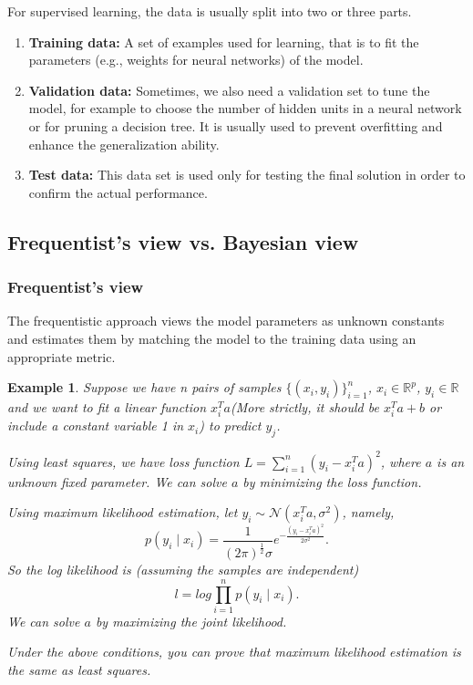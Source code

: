 \documentclass[11pt]{article}
\def\MN{{\mathcal N}}
\def\BR{{\mathbb R}}
\newtheorem{example}{Example}[section]
\begin{document}
For supervised learning, the data is usually split into two or three parts.
\begin{enumerate}[(1)]
\item \textbf{Training data:} A set of examples used for learning, that is to fit the parameters (e.g., weights for neural networks) of the model. 
\item \textbf{Validation data:}  Sometimes, we also need a validation set to tune the model, for example to choose the number of hidden units in a neural network or for pruning a decision tree. It is usually used to prevent overfitting and enhance the generalization ability.
\item \textbf{Test data:} This data set is used only for testing the final solution in order to confirm the actual performance.  
\end{enumerate}

\subsection{Frequentist's view vs. Bayesian view}
\subsubsection{Frequentist's view}
The frequentistic approach views the model parameters as unknown constants and estimates them by matching the model to the training data using an appropriate metric.

\begin{example}
Suppose we have n pairs of samples $\{(x_i, y_i)\}_{i=1}^{n}$, $x_i \in \BR^p$, $y_i \in \BR$ and we want to fit a linear function $x_i^Ta$(More strictly, it should be $x_i^T a+b$ or include a constant variable 1 in $x_i$) to predict $y_j$.

Using least squares, we have loss function $L = \sum_{i=1}^n (y_i - x_i^T a)^2$, where $a$ is an unknown fixed parameter. We can solve $a$ by minimizing the loss function.

Using maximum likelihood estimation, let $y_i \sim \MN(x_i^T a, \sigma^2)$, namely, $$p(y_i \mid x_i)=\frac{1}{(2\pi)^{\frac{1}{2}}\sigma}e^{-\frac{(y_i-x_i^Ta)^2}{2\sigma^2}}.$$ So the log likelihood is (assuming the samples are independent) $$l=log \prod_{i=1}^{n}p(y_i \mid x_i).$$We can solve $a$ by maximizing the joint likelihood.

Under the above conditions, you can prove that maximum likelihood estimation is the same as least squares.
\end{example}
\end{document}

